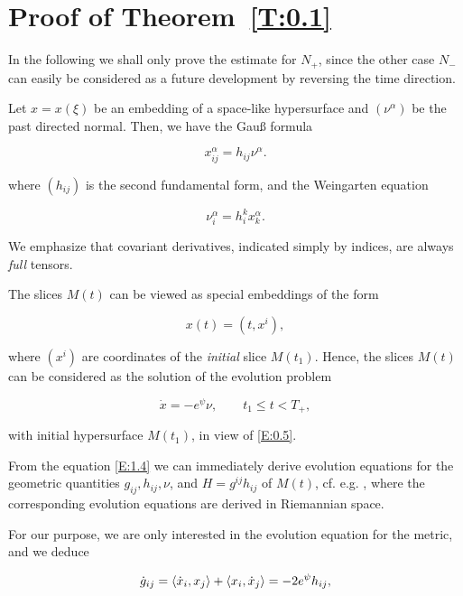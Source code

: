 \documentclass[ a4paper, oneside]{amsart}
\newcommand{\al}{\alpha}
\newcommand{\spd}[2]{\protect\langle #1,#2\protect\rangle}
\newcommand{\tit}{\textit}
\newcommand{\ci}{\cite}
\newcommand{\qq}{\qquad}
\newcommand\nd{\noindent}
\newcommand\cvm{\vspace\Cmedskipamount}
\newcommand\cvb{\vspace\Cbigskipamount}
\newcommand{\las}[1]{\label{S:#1}}
\newcommand{\lae}[1]{\label{E:#1}}
\newcommand{\rt}[1]{Theorem~\ref{T:#1}}
\newcommand{\re}[1]{\eqref{E:#1}}
\theoremstyle{plain}
\theoremstyle{definition}
\theoremstyle{remark}
\numberwithin{equation}{section}
\begin{document}
\cvb
\section{Proof of \rt{0.1}}\las{1}

\cvb
In the following we shall only prove the estimate for $N_+$, since the other case
$N_-$ can easily be considered as a future development by reversing the time
direction.

\cvm
Let $x=x(\xi)$ be an embedding of a space-like hypersurface and $(\nu^\al)$ be
the past directed normal. Then, we have the Gau{\ss} formula

\begin{equation}
x^\al_{ij}=h_{ij}\nu^\al.
\end{equation}

\cvm
\nd where $(h_{ij})$ is the second fundamental form, and the Weingarten equation

\begin{equation}
\nu^\al_i=h^k_ix^\al_k.
\end{equation}


\cvm
We emphasize that covariant derivatives, indicated simply by indices, are
always \tit{full} tensors.

\cvm
The slices $M(t)$ can be viewed as  special embeddings of the form

\begin{equation}
x(t)=(t,x^i),
\end{equation}

\cvm
\nd where $(x^i)$ are coordinates of the \tit{initial} slice $M(t_1)$. Hence, the
slices $M(t)$ can be considered as the solution of the evolution problem

\begin{equation}\lae{1.4}
\dot x=-e^\psi \nu, \qq t_1\le t<T_+,
\end{equation}

\cvm
\nd with initial hypersurface $M(t_1)$, in view of \re{0.5}.

\cvm From the equation \re{1.4} we can immediately derive evolution equations
for the geometric quantities $g_{ij}, h_{ij}, \nu$, and $H=g^{ij}h_{ij}$ of $M(t)$, cf.
e.g.
\ci[Section 4]{cg4}, where the corresponding evolution equations are derived in
Riemannian space.

\cvm
For our purpose, we are only interested in the evolution equation for the metric,
and we deduce

\begin{equation}
\dot g_{ij}=\spd{\dot x_i}{x_j}+\spd{x_i}{\dot x_j}=- 2e^\psi h_{ij},
\end{equation}
\end{document}
